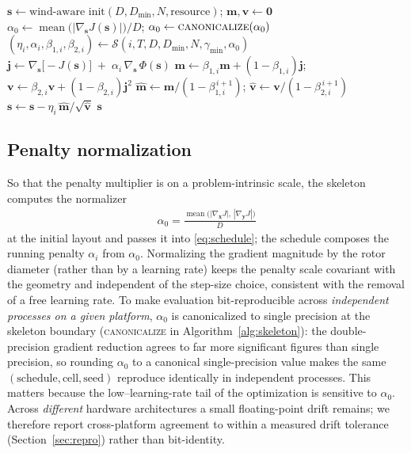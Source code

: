 \documentclass[11pt]{article}
\newcommand{\gm}{\gamma_{\min}}
\newcommand{\Dmin}{D_{\min}}
\begin{document}
\begin{algorithm}[t]
\caption{Fixed optimization skeleton (the search controls only $\mathcal{S}$)}
\label{alg:skeleton}
\begin{algorithmic}[1]
\State $\bm s \gets \text{wind-aware init}(D,\Dmin,N,\text{resource})$;\quad
       $\bm m,\bm v \gets \bm 0$
\State $\alpha_0 \gets \operatorname{mean}\!\big(|\nabla_{\!\bm s}J(\bm s)|\big)/D$;\quad
       $\alpha_0 \gets \textsc{canonicalize}(\alpha_0)$ 
  \State $(\eta_i,\alpha_i,\beta_{1,i},\beta_{2,i}) \gets
          \mathcal{S}(i,T,D,\Dmin,N,\gm,\alpha_0)$
  \State $\bm j \gets \nabla_{\!\bm s}\big[-J(\bm s)\big] \;+\; \alpha_i\,\nabla_{\!\bm s}\,\Phi(\bm s)$
  \State $\bm m \gets \beta_{1,i}\bm m + (1-\beta_{1,i})\bm j$;\quad
         $\bm v \gets \beta_{2,i}\bm v + (1-\beta_{2,i})\bm j^2$
  \State $\hat{\bm m}\gets \bm m/(1-\beta_{1,i}^{\,i+1})$;\quad
         $\hat{\bm v}\gets \bm v/(1-\beta_{2,i}^{\,i+1})$
  \State $\bm s \gets \bm s - \eta_i\,\hat{\bm m}/\sqrt{\hat{\bm v}}$
\EndFor
\State \Return $\bm s$
\end{algorithmic}
\end{algorithm}

\subsection{Penalty normalization}
\label{sec:alpha0}
So that the penalty multiplier is on a problem-intrinsic scale, the skeleton computes
the normalizer
\begin{align}
\alpha_0 = \frac{\operatorname{mean}\big(|\nabla_{\!\bm x}J|,\,|\nabla_{\!\bm y}J|\big)}{D}
\label{eq:alpha0}
\end{align}
at the initial layout and passes it into \cref{eq:schedule}; the schedule composes the
running penalty $\alpha_i$ from $\alpha_0$. Normalizing the gradient magnitude by the
rotor diameter (rather than by a learning rate) keeps the penalty scale covariant with
the geometry and independent of the step-size choice, consistent with the removal of a
free learning rate. To make evaluation bit-reproducible across \emph{independent
processes on a given platform}, $\alpha_0$ is canonicalized to single precision at the
skeleton boundary (\textsc{canonicalize} in Algorithm~\ref{alg:skeleton}): the
double-precision gradient reduction agrees to far more significant figures than single
precision, so rounding $\alpha_0$ to a canonical single-precision value makes the same
$(\text{schedule},\text{cell},\text{seed})$ reproduce identically in independent
processes. This matters because the low--learning-rate tail of the optimization is
sensitive to $\alpha_0$. Across \emph{different} hardware architectures a small
floating-point drift remains; we therefore report cross-platform agreement to within a
measured drift tolerance (Section~\ref{sec:repro}) rather than bit-identity.
\end{document}
